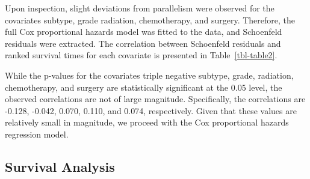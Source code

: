 \documentclass[
  letterpaper,
  DIV=11,
  numbers=noendperiod]{scrartcl}
\begin{document}
Upon inspection, slight deviations from parallelism were observed for
the covariates subtype, grade radiation, chemotherapy, and surgery.
Therefore, the full Cox proportional hazards model was fitted to the
data, and Schoenfeld residuals were extracted. The correlation between
Schoenfeld residuals and ranked survival times for each covariate is
presented in Table~\ref{tbl-table2}.

\begin{table}

\caption{\label{tbl-table2}{Schoenfeld Residual and Ranked Survival Time
Correlation}}


\end{table}%

While the p-values for the covariates triple negative subtype, grade,
radiation, chemotherapy, and surgery are statistically significant at
the 0.05 level, the observed correlations are not of large magnitude.
Specifically, the correlations are -0.128, -0.042, 0.070, 0.110, and
0.074, respectively. Given that these values are relatively small in
magnitude, we proceed with the Cox proportional hazards regression
model.

\clearpage

\subsection{Survival Analysis}\label{survival-analysis}
\end{document}
